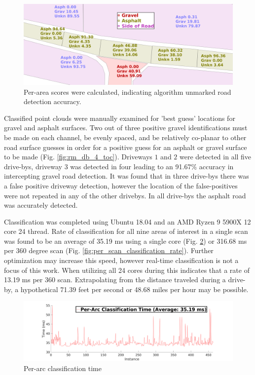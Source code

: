 \documentclass[journal,onecolumn]{IEEEtran}
\begin{document}
		\begin{figure}[H]
			\centering
			\includegraphics[width=0.75\linewidth]{figures/rm_db_1_area_score}
			\caption[Area Scores]{Per-area scores were calculated, indicating algorithm unmarked road detection accuracy. }
			\label{fig:prepostadjust}
		\end{figure}
	
		{Classified point clouds were manually examined for 'best guess' locations for gravel and asphalt surfaces. Two out of three positive gravel identifications must be made on each channel, be evenly spaced, and be relatively co-planar to other road surface guesses in order for a positive guess for an asphalt or gravel surface to be made (Fig. \ref{fig:rm_db_4_toc}). Driveways $1$ and $2$ were detected in all five drive-bys, driveway $3$ was detected in four leading to an 91.67\% accuracy in intercepting gravel road detection. It was found that in three drive-bys there was a false positive driveway detection, however the location of the false-positives were not repeated in any of the other drivebys. In all drive-bys the asphalt road was accurately detected. }
	
		{Classification was completed using Ubuntu 18.04 and an AMD Ryzen 9 5900X 12 core 24 thread. Rate of classification for all nine areas of interest in a single scan was found to be an average of 35.19 ms using a single core (Fig. \ref{fig:per_arc_classification_time}) or 316.68 ms per 360 degree scan (Fig. \ref{fig:per_scan_classification_rate}). Further optimization may increase this speed, however real-time classification is not a focus of this work. When utilizing all 24 cores during this indicates that a rate of 13.19 ms per 360 scan. Extrapolating from the distance traveled during a drive-by, a hypothetical 71.39 feet per second or 48.68 miles per hour may be possible.}
		
		\begin{figure}[H]
			\centering
			\includegraphics[width=0.75\linewidth]{figures/per_arc_classification_time}
			\caption[Per-Arc Time]{Per-arc classification time}
			\label{fig:per_arc_classification_time}
		\end{figure}
		
\end{document}
